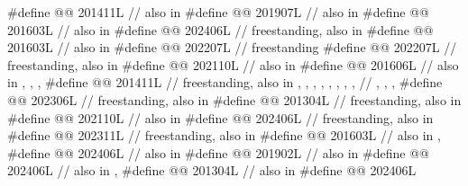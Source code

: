 \begin{codeblock}
#define @@                   201411L // also in 
#define @@                    201907L // also in 
#define @@            201603L // also in 
#define @@                            202406L // freestanding, also in 
#define @@                   201603L // also in 
#define @@                           202207L // freestanding
#define @@             202207L // freestanding, also in 
#define @@                202110L // also in 
#define @@                      201606L
  // also in , , , 
#define @@        201411L
  // freestanding, also in , , , , , , , ,
  // , , , 
#define @@                            202306L // freestanding, also in 
#define @@                    201304L // freestanding, also in 
#define @@                          202110L // also in 
#define @@            202406L // freestanding, also in 
#define @@                           202311L // freestanding, also in 
#define @@                201603L // also in , 
#define @@                     202406L // also in 
#define @@             201902L // also in 
#define @@                             202406L // also in , 
#define @@                  201304L // also in 
#define @@                            202406L

\end{codeblock}
